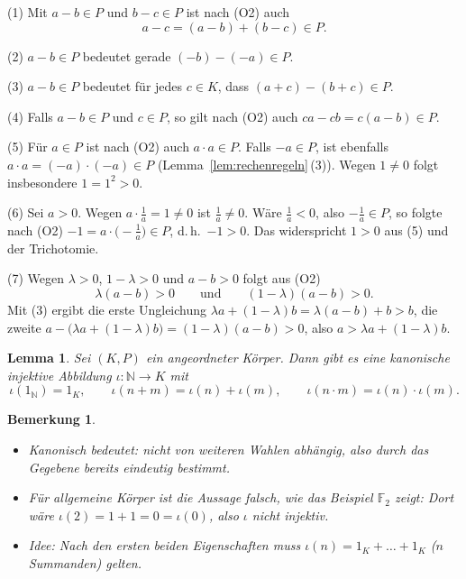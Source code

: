 \documentclass[a4paper]{article}
\makeatletter
\theoremstyle{kurzskript}
\newtheorem{lemma}[satz]{Lemma}
\newtheorem*{bem}{Bemerkung}
\renewenvironment{proof}[1][\proofname]{\par\pushQED{\qed}%
  \normalfont\topsep\medskipamount\relax
  \trivlist\item[\hskip\labelsep\bfseries #1\@addpunct{.}]\ignorespaces}%
  {\popQED\endtrivlist\@endpefalse}
\renewcommand{\proofname}{Beweis}
\newcommand{\N}{\mathbb{N}}
\makeatother
\begin{document}
\begin{proof}
(1) Mit $a - b \in P$ und $b - c \in P$ ist nach (O2) auch
\[
  a - c = (a - b) + (b - c) \in P.
\]

(2) $a - b \in P$ bedeutet gerade $(-b) - (-a) \in P$.

(3) $a - b \in P$ bedeutet für jedes $c \in K$, dass $(a + c) - (b + c) \in P$.

(4) Falls $a - b \in P$ und $c \in P$, so gilt nach (O2) auch $ca - cb = c(a - b) \in P$.

(5) Für $a \in P$ ist nach (O2) auch $a \cdot a \in P$. Falls $-a \in P$, ist ebenfalls $a \cdot a = (-a) \cdot (-a) \in P$ (Lemma~\ref{lem:rechenregeln}\,(3)). Wegen $1 \neq 0$ folgt insbesondere $1 = 1^2 > 0$.

(6) Sei $a > 0$. Wegen $a \cdot \frac{1}{a} = 1 \neq 0$ ist $\frac{1}{a} \neq 0$. Wäre $\frac{1}{a} < 0$, also $-\frac{1}{a} \in P$, so folgte nach (O2) $-1 = a \cdot \bigl(-\frac{1}{a}\bigr) \in P$, d.\,h.\ $-1 > 0$. Das widerspricht $1 > 0$ aus (5) und der Trichotomie.

(7) Wegen $\lambda > 0$, $1 - \lambda > 0$ und $a - b > 0$ folgt aus (O2)
\[
  \lambda (a - b) > 0 \qquad\text{und}\qquad (1 - \lambda)(a - b) > 0.
\]
Mit (3) ergibt die erste Ungleichung $\lambda a + (1 - \lambda) b = \lambda (a - b) + b > b$, die zweite $a - \bigl(\lambda a + (1 - \lambda) b\bigr) = (1 - \lambda)(a - b) > 0$, also $a > \lambda a + (1 - \lambda) b$.
\end{proof}

\begin{lemma}\label{lem:einbettung-N}
Sei $(K, P)$ ein angeordneter Körper. Dann gibt es eine kanonische injektive Abbildung $\iota\colon \N \to K$ mit
\[
  \iota(1_{\N}) = 1_K, \qquad \iota(n + m) = \iota(n) + \iota(m), \qquad \iota(n \cdot m) = \iota(n) \cdot \iota(m).
\]
\end{lemma}

\begin{bem}
\leavevmode
\begin{itemize}
  \item \emph{Kanonisch} bedeutet: nicht von weiteren Wahlen abhängig, also durch das Gegebene bereits eindeutig bestimmt.
  \item Für allgemeine Körper ist die Aussage falsch, wie das Beispiel $\mathbb{F}_2$ zeigt: Dort wäre $\iota(2) = 1 + 1 = 0 = \iota(0)$, also $\iota$ nicht injektiv.
  \item \emph{Idee:} Nach den ersten beiden Eigenschaften muss $\iota(n) = 1_K + \dots + 1_K$ ($n$ Summanden) gelten.
\end{itemize}
\end{bem}
\end{document}
